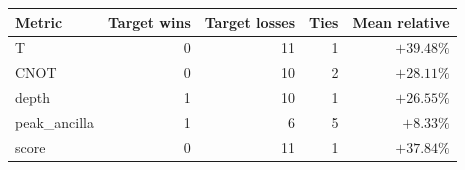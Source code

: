 \begin{tabular}{lrrrr}
\toprule
Metric & Target wins & Target losses & Ties & Mean relative \\
\midrule
T & 0 & 11 & 1 & $+39.48\%$ \\
CNOT & 0 & 10 & 2 & $+28.11\%$ \\
depth & 1 & 10 & 1 & $+26.55\%$ \\
peak_ancilla & 1 & 6 & 5 & $+8.33\%$ \\
score & 0 & 11 & 1 & $+37.84\%$ \\
\bottomrule
\end{tabular}

